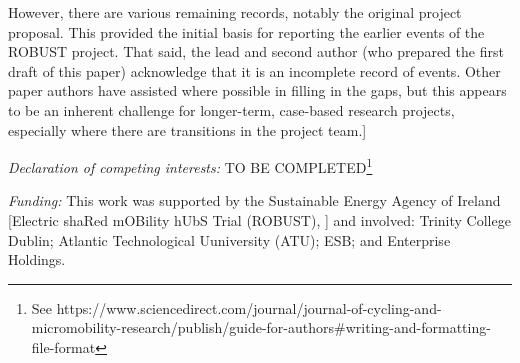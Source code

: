 \documentclass[preprint, 3p,
authoryear]{elsarticle} %
\begin{document}
However, there are various remaining records, notably the original
project proposal. This provided the initial basis for reporting the
earlier events of the ROBUST project. That said, the lead and second
author (who prepared the first draft of this paper) acknowledge that it
is an incomplete record of events. Other paper authors have assisted
where possible in filling in the gaps, but this appears to be an
inherent challenge for longer-term, case-based research projects,
especially where there are transitions in the project team.{]}

\vspace{1cm}

\emph{Declaration of competing interests:} TO BE COMPLETED\footnote{See
  https://www.sciencedirect.com/journal/journal-of-cycling-and-micromobility-research/publish/guide-for-authors\#writing-and-formatting-file-format}

\vspace{1cm}

\emph{Funding:} This work was supported by the Sustainable Energy Agency
of Ireland {[}Electric shaRed mOBility hUbS Trial (ROBUST), {]} and
involved: Trinity College Dublin; Atlantic Technological Uuniversity
(ATU); ESB; and Enterprise Holdings.

\begingroup\fontsize{8}{10}\selectfont
\end{document}
